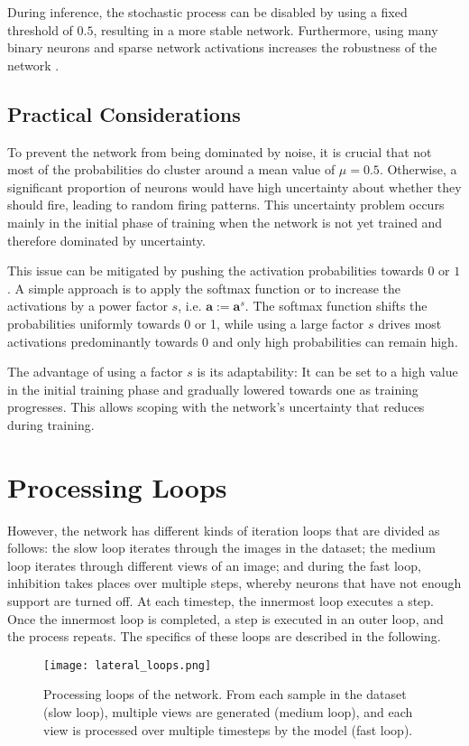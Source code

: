 During inference, the stochastic process can be disabled by using a fixed threshold of $0.5$, resulting in a more stable network.
Furthermore, using many binary neurons and sparse network activations increases the robustness of the network \cite{ahmad_properties_2015}.


\subsection{Practical Considerations}
To prevent the network from being dominated by noise, it is crucial that not most of the probabilities do cluster around a mean value of $\mu = 0.5$. Otherwise, a significant proportion of neurons would have high uncertainty about whether they should fire, leading to random firing patterns. This uncertainty problem occurs mainly in the initial phase of training when the network is not yet trained and therefore dominated by uncertainty.

This issue can be mitigated by pushing the activation probabilities towards $0$ or $1$. A simple approach is to apply the softmax function or to increase the activations by a power factor $s$, i.e. $\boldsymbol{a} := \boldsymbol{a}^s$. The softmax function shifts the probabilities uniformly towards 0 or 1, while using a large factor $s$ drives most activations predominantly towards 0 and only high probabilities can remain high.

The advantage of using a factor $s$ is its adaptability: It can be set to a high value in the initial training phase and gradually lowered towards one as training progresses. This allows scoping with the network's uncertainty that reduces during training.


\section{Processing Loops}
However, the network has different kinds of iteration loops that are divided as follows:
the slow loop iterates through the images in the dataset; the medium loop iterates through different views of an image; and during the fast loop, inhibition takes places over multiple steps, whereby neurons that have not enough support are turned off.
At each timestep, the innermost loop executes a step. Once the innermost loop is completed, a step is executed in an outer loop, and the process repeats. The specifics of these loops are described in the following.

\begin{figure}[h]
    \centering
    \texttt{[image: lateral\_loops.png]}
    \caption[Processing loops of the network]{Processing loops of the network. From each sample in the dataset (slow loop), multiple views are generated (medium loop), and each view is processed over multiple timesteps by the model (fast loop).}
\end{figure}

